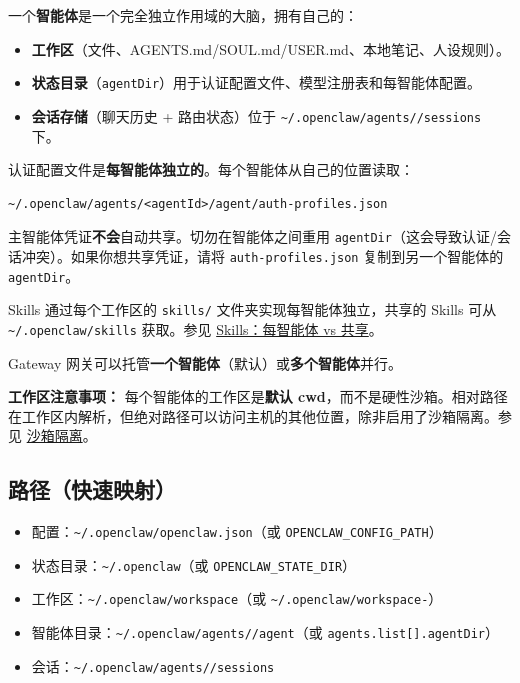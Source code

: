 一个\textbf{智能体}是一个完全独立作用域的大脑，拥有自己的：

\begin{itemize}
  \item \textbf{工作区}（文件、AGENTS.md/SOUL.md/USER.md、本地笔记、人设规则）。
  \item \textbf{状态目录}（\texttt{agentDir}）用于认证配置文件、模型注册表和每智能体配置。
  \item \textbf{会话存储}（聊天历史 + 路由状态）位于 \texttt{\textasciitilde{}/.openclaw/agents//sessions} 下。
\end{itemize}


认证配置文件是\textbf{每智能体独立的}。每个智能体从自己的位置读取：

\begin{lstlisting}
~/.openclaw/agents/<agentId>/agent/auth-profiles.json
\end{lstlisting}


主智能体凭证\textbf{不会}自动共享。切勿在智能体之间重用 \texttt{agentDir}（这会导致认证/会话冲突）。如果你想共享凭证，请将 \texttt{auth-profiles.json} 复制到另一个智能体的 \texttt{agentDir}。

Skills 通过每个工作区的 \texttt{skills/} 文件夹实现每智能体独立，共享的 Skills 可从 \texttt{\textasciitilde{}/.openclaw/skills} 获取。参见 \href{/tools/skills\#per-agent-vs-shared-skills}{Skills：每智能体 vs 共享}。

Gateway 网关可以托管\textbf{一个智能体}（默认）或\textbf{多个智能体}并行。

\textbf{工作区注意事项：} 每个智能体的工作区是\textbf{默认 cwd}，而不是硬性沙箱。相对路径在工作区内解析，但绝对路径可以访问主机的其他位置，除非启用了沙箱隔离。参见 \href{/gateway/sandboxing}{沙箱隔离}。

\subsection{路径（快速映射）}


\begin{itemize}
  \item 配置：\texttt{\textasciitilde{}/.openclaw/openclaw.json}（或 \texttt{OPENCLAW\_CONFIG\_PATH}）
  \item 状态目录：\texttt{\textasciitilde{}/.openclaw}（或 \texttt{OPENCLAW\_STATE\_DIR}）
  \item 工作区：\texttt{\textasciitilde{}/.openclaw/workspace}（或 \texttt{\textasciitilde{}/.openclaw/workspace-}）
  \item 智能体目录：\texttt{\textasciitilde{}/.openclaw/agents//agent}（或 \texttt{agents.list[].agentDir}）
  \item 会话：\texttt{\textasciitilde{}/.openclaw/agents//sessions}
\end{itemize}


